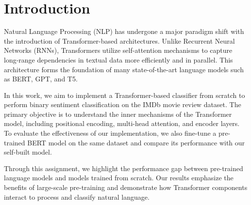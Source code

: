 \section{Introduction}
\label{sec:intro}

Natural Language Processing (NLP) has undergone a major paradigm shift with the introduction of Transformer-based architectures. Unlike Recurrent Neural Networks (RNNs), Transformers utilize self-attention mechanisms to capture long-range dependencies in textual data more efficiently and in parallel. This architecture forms the foundation of many state-of-the-art language models such as BERT, GPT, and T5.

In this work, we aim to implement a Transformer-based classifier from scratch to perform binary sentiment classification on the IMDb movie review dataset. The primary objective is to understand the inner mechanisms of the Transformer model, including positional encoding, multi-head attention, and encoder layers. To evaluate the effectiveness of our implementation, we also fine-tune a pre-trained BERT model on the same dataset and compare its performance with our self-built model.

Through this assignment, we highlight the performance gap between pre-trained language models and models trained from scratch. Our results emphasize the benefits of large-scale pre-training and demonstrate how Transformer components interact to process and classify natural language.